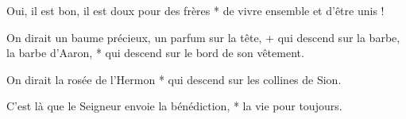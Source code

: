 \item Oui, il est bon, il est doux pour des frères * de vivre ensemble et d'être unis !

\item On dirait un baume précieux, un parfum sur la tête, + qui descend sur la barbe, la barbe d'Aaron, * qui descend sur le bord de son vêtement.

\item On dirait la rosée de l'Hermon * qui descend sur les collines de Sion. 

\item C'est là que le Seigneur envoie la bénédiction, * la vie pour toujours.